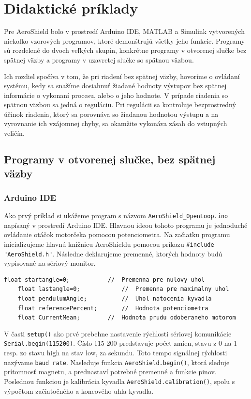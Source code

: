 \chapter{Didaktické príklady}
\label{Didaktické príklady}

Pre AeroShield bolo v prostredí Arduino IDE, MATLAB a Simulink vytvorených niekoľko vzorových programov, ktoré demonštrujú všetky jeho funkcie. Programy sú rozdelené do dvoch veľkých skupín, konkrétne programy v otvorenej slučke bez spätnej väzby a programy v uzavretej slučke so spätnou väzbou. 

Ich rozdiel spočíva v tom, že pri riadení bez spätnej väzby, hovoríme o ovládaní systému, kedy sa snažíme dosiahnuť žiadané hodnoty výstupov bez spätnej informácie o vykonaní procesu, alebo o jeho hodnote. V prípade riadenia so spätnou väzbou sa jedná o reguláciu. Pri regulácii sa kontroluje bezprostredný účinok riadenia, ktorý sa porovnáva so žiadanou hodnotou výstupu a na vyrovnanie ich vzájomnej chyby, sa okamžite vykonáva zásah do vstupných veličín. 

\section{Programy v otvorenej slučke, bez spätnej väzby}
\subsection{Arduino IDE}
\label{bezspatnej}

Ako prvý príklad si ukážeme program s názvom \verb|AeroShield_OpenLoop.ino| napísaný v prostredí Arduino IDE. Hlavnou ideou tohoto programu je jednoduché ovládanie otáčok motorčeka pomocou potenciometra. Na začiatku programu inicializujeme hlavnú knižnicu AeroShieldu pomocou príkazu \verb|#include "AeroShield.h"|. Následne deklarujeme premenné, ktorých hodnoty budú vypisované na sériový monitor. 

\begin{lstlisting}[caption={AeroShield open loop dekleracia.},captionpos=b]
	float startangle=0;           //  Premenna pre nulovy uhol
	float lastangle=0;            //  Premenna pre maximalny uhol 
	float pendulumAngle;          //  Uhol natocenia kyvadla
	float referencePercent;       //  Hodnota potenciometra
	float CurrentMean;	      //  Hodnota prudu odoberaneho motorom 
\end{lstlisting}

V časti \verb|setup()| ako prvé prebehne nastavenie rýchlosti sériovej komunikácie \newline\verb|Serial.begin(115200)|. Číslo 115 200 predstavuje počet zmien, stavu z 0 na 1 resp. zo stavu high na stav low, za sekundu. Toto tempo signálnej rýchlosti nazývame \verb|baud rate|. Nasleduje funkcia \verb|AeroShield.begin()|, ktorá sleduje prítomnosť magnetu, a prednastaví potrebné premenné a funkcie pinov. Poslednou funkciou je kalibrácia kyvadla \verb|AeroShield.calibration()|, spolu s výpočtom začiatočného a koncového uhla kyvadla. 

